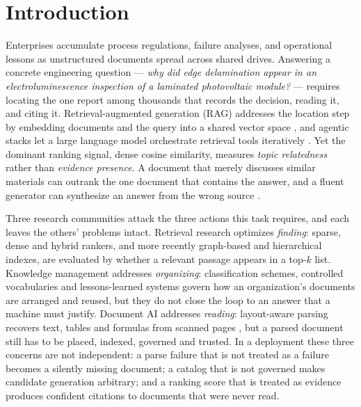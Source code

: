 \section{Introduction}
\label{sec:intro}

Enterprises accumulate process regulations, failure analyses, and operational
lessons as unstructured documents spread across shared drives. Answering a
concrete engineering question --- \emph{why did edge delamination appear in an
electroluminescence inspection of a laminated photovoltaic module?} ---
requires locating the one report among thousands that records the decision,
reading it, and citing it. Retrieval-augmented generation (RAG) addresses the
location step by embedding documents and the query into a shared vector space
\cite{rag-lewis,dpr}, and agentic stacks let a large language model orchestrate
retrieval tools iteratively \cite{mcp,singh-agentic-rag}. Yet the dominant
ranking signal, dense cosine similarity, measures \emph{topic relatedness}
rather than \emph{evidence presence}. A document that merely discusses similar
materials can outrank the one document that contains the answer, and a fluent
generator can synthesize an answer from the wrong source
\cite{siren,gao-ragsurvey}.

Three research communities attack the three actions this task requires, and
each leaves the others' problems intact. Retrieval research optimizes
\emph{finding}: sparse, dense and hybrid rankers, and more recently graph-based
and hierarchical indexes, are evaluated by whether a relevant passage appears
in a top-$k$ list. Knowledge management addresses \emph{organizing}:
classification schemes, controlled vocabularies and lessons-learned systems
govern how an organization's documents are arranged and reused, but they do not
close the loop to an answer that a machine must justify. Document AI addresses
\emph{reading}: layout-aware parsing recovers text, tables and formulas from
scanned pages \cite{mineru}, but a parsed document still has to be placed,
indexed, governed and trusted. In a deployment these three concerns are not
independent: a parse failure that is not treated as a failure becomes a
silently missing document; a catalog that is not governed makes candidate
generation arbitrary; and a ranking score that is treated as evidence produces
confident citations to documents that were never read.

